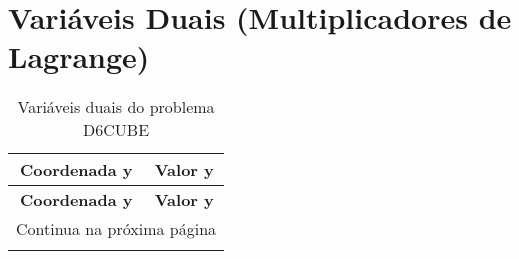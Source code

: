 \documentclass[12pt]{article}
\begin{document}
\begin{longtable}{@{}cccc@{}}
\end{longtable}

\section{Variáveis Duais (Multiplicadores de Lagrange)}

\begin{longtable}{@{}cc@{}}
\caption{Variáveis duais do problema D6CUBE} \\
\toprule
\textbf{Coordenada y} & \textbf{Valor y} \\
\midrule
\endfirsthead

\toprule
\textbf{Coordenada y} & \textbf{Valor y} \\
\midrule
\endhead

\midrule \multicolumn{2}{r}{{Continua na próxima página}} \\ \midrule
\endfoot


\end{longtable}
\end{document}
